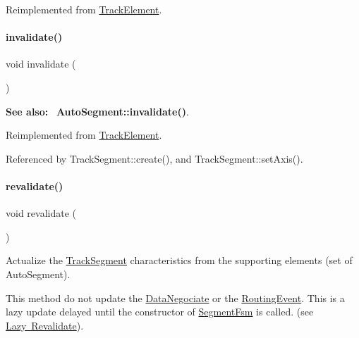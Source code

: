 Reimplemented from \mbox{\hyperlink{classKite_1_1TrackElement_ac295bade8aee589f6718dfa79edc2a34}{Track\+Element}}.

\mbox{\label{classKite_1_1TrackSegment_a893f1101c650c08c98612515c2b1a89c}} 
\paragraph{\texorpdfstring{invalidate()}{invalidate()}}
{\footnotesize\ttfamily void invalidate (\begin{DoxyParamCaption}{ }\end{DoxyParamCaption})\hspace{0.3cm}{\ttfamily [virtual]}}

{\bfseries See also\+:}~ \textbf{ Auto\+Segment\+::invalidate()}. 

Reimplemented from \mbox{\hyperlink{classKite_1_1TrackElement_a893f1101c650c08c98612515c2b1a89c}{Track\+Element}}.



Referenced by Track\+Segment\+::create(), and Track\+Segment\+::set\+Axis().

\mbox{\label{classKite_1_1TrackSegment_a5bd93abe1416952ace15a98dbeeed124}} 
\paragraph{\texorpdfstring{revalidate()}{revalidate()}}
{\footnotesize\ttfamily void revalidate (\begin{DoxyParamCaption}{ }\end{DoxyParamCaption})\hspace{0.3cm}{\ttfamily [virtual]}}

Actualize the \mbox{\hyperlink{classKite_1_1TrackSegment}{Track\+Segment}} characteristics from the supporting elements (set of Auto\+Segment).

This method do not update the \mbox{\hyperlink{classKite_1_1DataNegociate}{Data\+Negociate}} or the \mbox{\hyperlink{classKite_1_1RoutingEvent}{Routing\+Event}}. This is a lazy update delayed until the constructor of \mbox{\hyperlink{classKite_1_1SegmentFsm}{Segment\+Fsm}} is called. (see \mbox{\hyperlink{classKite_1_1TrackSegment_secTSLazyRevalidate}{Lazy Revalidate}}). 

